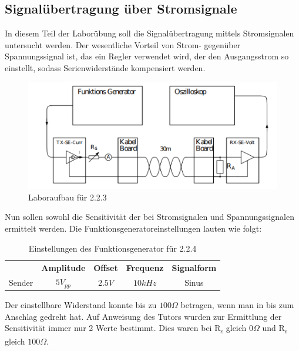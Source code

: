 \documentclass[a4paper,12pt]{article}
\begin{document}
	\subsection{Signalübertragung über Stromsignale}
	In diesem Teil der Laborübung soll die Signalübertragung mittels Stromsignalen untersucht werden. Der wesentliche Vorteil von Strom- gegenüber Spannungssignal ist, das ein Regler verwendet wird, der den Ausgangsstrom so einstellt, sodass Serienwiderstände kompensiert werden.
	\begin{figure}[h]
		\centering
		\includegraphics[width=15cm]{img/Laboraufbau2_2_3}
		\caption{Laboraufbau für 2.2.3}
	\end{figure}
	\newline
	Nun sollen sowohl die Sensitivität der bei Stromsignalen und Spannungssignalen ermittelt werden. Die Funktionsgeneratoreinstellungen lauten wie folgt:
	\begin{table}[h]
		\centering
		\begin{tabular}{|c|c|c|c|c|}
			\hline
			\multirow{2}{*}{} & \multirow{2}{*}{\textbf{Amplitude}} & \multirow{2}{*}{\textbf{Offset}} & \multirow{2}{*}{\textbf{Frequenz}} & \multirow{2}{*}{\textbf{Signalform}} \\
			&  &  &  &  \\ \hline
			\multirow{2}{*}{Sender} & \multirow{2}{*}{$5V_{pp}$} & \multirow{2}{*}{$2.5V$} & \multirow{2}{*}{$10kHz$} & \multirow{2}{*}{Sinus} \\
			&  &  &  &  \\ \hline
		\end{tabular}
		\caption{Einstellungen des Funktionsgenerator für 2.2.4}
	\end{table}
	\newline
	Der einstellbare Widerstand konnte bis zu $100\Omega$ betragen, wenn man in bis zum Anschlag gedreht hat. Auf Anweisung des Tutors wurden zur Ermittlung der Sensitivität immer nur 2 Werte bestimmt. Dies waren bei R\textsubscript{s} gleich $0\Omega$ und R\textsubscript{s} gleich $100\Omega$.
\end{document}
